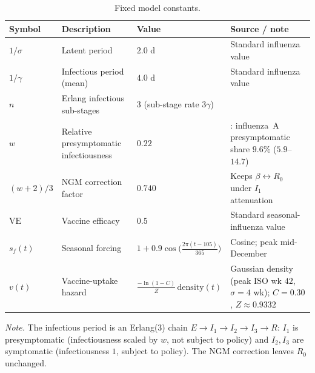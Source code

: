 \documentclass[12pt]{article}
\theoremstyle{plain}
\theoremstyle{remark}
\theoremstyle{definition}
\begin{document}
\begin{table}[H]
\centering
\caption{Fixed model constants.}
\label{tab:param_fixed}
\small
\begin{tabular}{@{}l p{3.5cm} p{4.0cm} p{4.4cm}@{}}
\toprule
Symbol & Description & Value & Source / note \\
\midrule
$1/\sigma$ & Latent period & $2.0$ d & Standard influenza value \\
$1/\gamma$ & Infectious period (mean) & $4.0$ d & Standard influenza value \\
$n$ & Erlang infectious sub-stages & $3$ (sub-stage rate $3\gamma$) & \cite{Wearing2005} \\
$w$ & Relative presymptomatic infectiousness & $0.22$ & \cite{NatureHealth2026}: influenza~A presymptomatic share $9.6\%$ ($5.9$--$14.7$) \\
$(w{+}2)/3$ & NGM correction factor & $0.740$ & Keeps $\beta\!\leftrightarrow\!R_0$ under $I_1$ attenuation \\
$\mathrm{VE}$ & Vaccine efficacy & $0.5$ & Standard seasonal-influenza value \\
$s_f(t)$ & Seasonal forcing & $1+0.9\cos\!\big(\tfrac{2\pi(t-105)}{365}\big)$ & Cosine; peak mid-December \\
$v(t)$ & Vaccine-uptake hazard & $\tfrac{-\ln(1-C)}{Z}\,\mathrm{density}(t)$ & Gaussian density (peak ISO wk $42$, $\sigma{=}4$ wk); $C{=}0.30$, $Z{\approx}0.9332$ \\
\bottomrule
\end{tabular}
\par\vspace{2mm}
{\footnotesize\textit{Note.} The infectious period is an Erlang(3) chain $E\to I_1\to I_2\to I_3\to R$: $I_1$ is presymptomatic (infectiousness scaled by $w$, not subject to policy) and $I_2,I_3$ are symptomatic (infectiousness $1$, subject to policy). The NGM correction leaves $R_0$ unchanged.}
\end{table}
\end{document}
